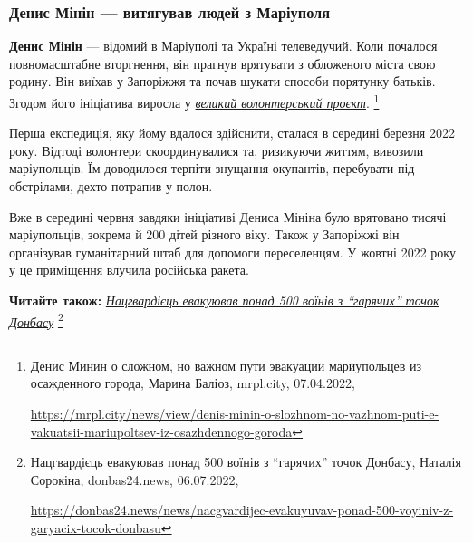  
 
 
 
 

\subsubsection{Денис Мінін — витягував людей з Маріуполя}


\textbf{Денис Мінін} — відомий в Маріуполі та Україні телеведучий. Коли почалося
повномасштабне вторгнення, він прагнув врятувати з обложеного міста свою
родину. Він виїхав у Запоріжжя та почав шукати способи порятунку батьків.
Згодом його ініціатива виросла у \href{https://mrpl.city/news/view/denis-minin-o-slozhnom-no-vazhnom-puti-e-vakuatsii-mariupoltsev-iz-osazhdennogo-goroda}{\emph{великий волонтерський проєкт}}.%
\footnote{Денис Минин о сложном, но важном пути эвакуации мариупольцев из осажденного города, Марина Баліоз, mrpl.city, 07.04.2022, \par\url{https://mrpl.city/news/view/denis-minin-o-slozhnom-no-vazhnom-puti-e-vakuatsii-mariupoltsev-iz-osazhdennogo-goroda}}

Перша експедиція, яку йому вдалося здійснити, сталася в середині березня 2022
року. Відтоді волонтери скоординувалися та, ризикуючи життям, вивозили
маріупольців. Їм доводилося терпіти знущання окупантів, перебувати під
обстрілами, дехто потрапив у полон.

Вже в середині червня завдяки ініціативі Дениса Мініна було врятовано тисячі
маріупольців, зокрема й 200 дітей різного віку. Також у Запоріжжі він
організував гуманітарний штаб для допомоги переселенцям. У жовтні 2022 року у
це приміщення влучила російська ракета.

\textbf{Читайте також:} \href{https://donbas24.news/news/nacgvardijec-evakuyuvav-ponad-500-voyiniv-z-garyacix-tocok-donbasu}{\emph{Нацгвардієць евакуював понад 500 воїнів з \enquote{гарячих} точок Донбасу}}%
\footnote{Нацгвардієць евакуював понад 500 воїнів з \enquote{гарячих} точок Донбасу, Наталія Сорокіна, donbas24.news, 06.07.2022, \par%
\url{https://donbas24.news/news/nacgvardijec-evakuyuvav-ponad-500-voyiniv-z-garyacix-tocok-donbasu}%
}
